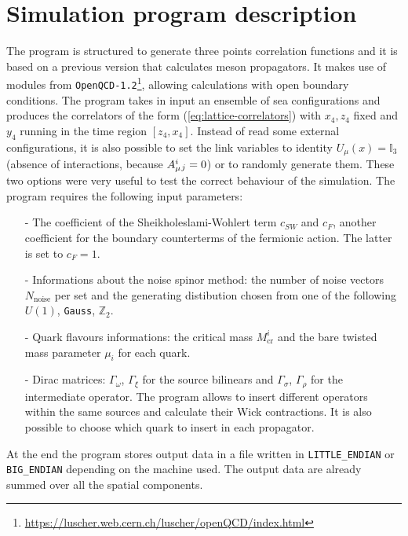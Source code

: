 \documentclass[english, LaM, oneside, noexaminfo]{sapthesis}
\begin{document}
\section{Simulation program description}\label{sec:program}
\noindent
The program is structured to generate three points correlation functions and it is based on a previous version that calculates meson propagators.
It makes use of modules from \texttt{OpenQCD-1.2}\footnote{\href{https://luscher.web.cern.ch/luscher/openQCD/index.html}{https://luscher.web.cern.ch/luscher/openQCD/index.html}}, allowing calculations with open boundary conditions.
The program takes in input an ensemble of sea configurations and produces the correlators of the form (\ref{eq:lattice-correlators}) with $x_4, z_4$ fixed and $y_4$ running in the time region $[z_4,x_4]$.
Instead of read some external configurations, it is also possible to set the link variables to identity $U_\mu(x) = \mathbb{I}_3$ (absence of interactions, because $A_\mu^{i} \hspace*{.1mm}_j = 0$) or to randomly generate them.
These two options were very useful to test the correct behaviour of the simulation.
The program requires the following input parameters:
\begin{itemize}
    \item [-] The coefficient of the Sheikholeslami-Wohlert term $c_{SW}$ and $c_F$, another coefficient for the boundary counterterms of the fermionic action.
                The latter is set to $c_F = 1$.
    \item [-] Informations about the noise spinor method: the number of noise vectors $N_\text{noise}$ per set and the generating distibution chosen from one of the following $U(1)$, \texttt{Gauss}, $\mathbb{Z}_2$.
    \item [-] Quark flavours informations: the critical mass $M^i_\text{cr}$ and the bare twisted mass parameter $\mu_i$ for each quark.
    \item [-] Dirac matrices: $\Gamma_\omega$, $\Gamma_\xi$ for the source bilinears and $\Gamma_\sigma$, $\Gamma_\rho$ for the intermediate operator.
        The program allows to insert different operators within the same sources and calculate their Wick contractions.
        It is also possible to choose which quark to insert in each propagator.
\end{itemize}
At the end the program stores output data in a file written in \texttt{LITTLE\_ENDIAN} or \texttt{BIG\_ENDIAN} depending on the machine used.
The output data are already summed over all the spatial components.
\end{document}
